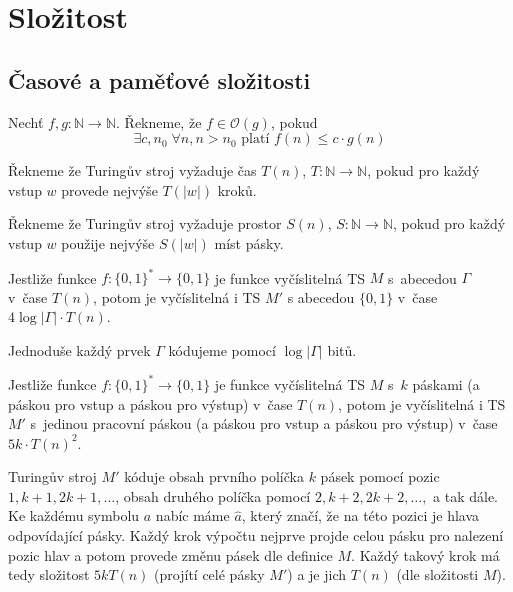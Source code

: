 \section{Složitost}

\subsection{Časové a paměťové složitosti}

\begin{definition}
    Nechť $f, g : \mathbb{N} \to \mathbb{N}$. Řekneme, že
    $f \in \mathcal{O}(g)$, pokud
    \[
        \exists c, n_0 \; \forall n, n > n_0
        \text{ platí }
        f(n) \leq c \cdot g(n)
    \]
\end{definition}

\begin{definition}
Řekneme že Turingův stroj vyžaduje čas $T(n)$, $T : \mathbb{N} \to \mathbb{N}$,
pokud pro každý vstup $w$ provede nejvýše $T(\lvert w \rvert)$ kroků.

Řekneme že Turingův stroj vyžaduje prostor $S(n)$, $S : \mathbb{N} \to \mathbb{N}$,
pokud pro každý vstup $w$ použije nejvýše $S(\lvert w \rvert)$ míst
pásky.
\end{definition}

\begin{claim}
    Jestliže funkce $f : \{0, 1\}^* \to \{0, 1\}$ je funkce vyčíslitelná
    TS $M$ s~abecedou $\Gamma$ v~čase $T(n)$, potom je vyčíslitelná i
    TS $M'$ s abecedou $\{0,1\}$ v~čase $4 \log \lvert \Gamma \rvert
    \cdot T(n)$.
\end{claim}

Jednoduše každý prvek $\Gamma$ kódujeme pomocí $\log \lvert \Gamma
\rvert$ bitů.

\begin{claim}
    Jestliže funkce $f : \{0, 1\}^* \to \{0, 1\}$ je funkce vyčíslitelná
    TS $M$ s~$k$ páskami (a páskou pro vstup a páskou pro výstup) v~čase $T(n)$,
    potom je vyčíslitelná i TS $M'$ s~jedinou pracovní páskou (a páskou
    pro vstup a páskou pro výstup) v~čase
    $5 k \cdot T(n)^2$.
\end{claim}

Turingův stroj $M'$ kóduje obsah prvního políčka $k$ pásek pomocí pozic
$1, k+1, 2k+1,\ldots$, obsah druhého políčka pomocí $2, k+2,
2k+2,\ldots,$ a tak dále. Ke každému symbolu $a$ nabíc máme $\hat a$,
který značí, že na této pozici je hlava odpovídající pásky.
Každý krok výpočtu nejprve projde celou pásku pro nalezení pozic hlav
a potom provede změnu pásek dle definice $M$. Každý takový krok má tedy
složitost $5kT(n)$ (projítí celé pásky $M'$) a je jich $T(n)$ (dle složitosti $M$).

